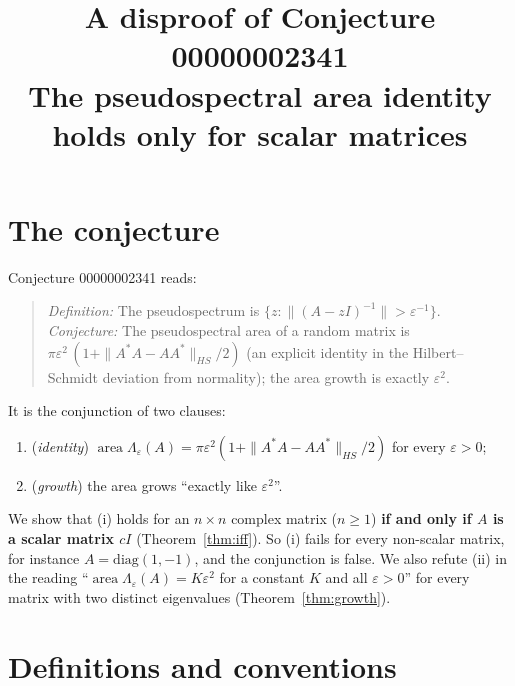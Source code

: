 \documentclass[11pt]{article}
\title{A disproof of Conjecture 00000002341\\[2pt]
\large The pseudospectral area identity holds only for scalar matrices}
\date{}
\theoremstyle{definition}
\theoremstyle{remark}
\renewcommand{\_}{\oldus\allowbreak}
\newcommand{\area}{\operatorname{area}}
\begin{document}
\sloppy
\maketitle

\section{The conjecture}

Conjecture 00000002341 reads:

\begin{quote}
\emph{Definition:} The pseudospectrum is $\{z : \|(A-zI)^{-1}\| > \varepsilon^{-1}\}$.
\emph{Conjecture:} The pseudospectral area of a random matrix is
$\pi\varepsilon^2\,(1 + \|A^*A - AA^*\|_{HS}/2)$ (an explicit identity in the Hilbert--Schmidt deviation from
normality); the area growth is exactly $\varepsilon^2$.
\end{quote}

It is the conjunction of two clauses:
\begin{enumerate}[label=(\roman*)]
  \item (\emph{identity}) $\area \Lambda_\varepsilon(A) = \pi\varepsilon^2(1 + \|A^*A-AA^*\|_{HS}/2)$ for every
        $\varepsilon>0$;
  \item (\emph{growth}) the area grows ``exactly like $\varepsilon^2$''.
\end{enumerate}
We show that (i) holds for an $n\times n$ complex matrix ($n\ge 1$) \textbf{if and only if $A$ is a scalar
matrix $cI$} (Theorem~\ref{thm:iff}). So (i) fails for every non-scalar matrix, for instance
$A=\mathrm{diag}(1,-1)$, and the conjunction is false. We also refute (ii) in the reading
``$\area\Lambda_\varepsilon(A) = K\varepsilon^2$ for a constant $K$ and all $\varepsilon>0$'' for every matrix
with two distinct eigenvalues (Theorem~\ref{thm:growth}).

\section{Definitions and conventions}
\end{document}
